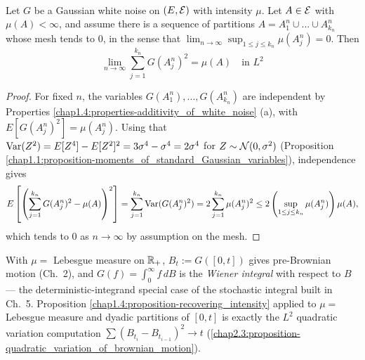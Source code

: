 \begin{proposition} \label{chap1.4:proposition-recovering_intensity}
 \\
Let $G$ be a Gaussian white noise on $(E,\mathcal{E})$ with intensity $\mu$. Let $A \in \mathcal{E}$ with $\mu(A)<\infty$, and assume there is a sequence of partitions $A=A_1^n\cup...\cup A_{k_n}^n$ whose mesh tends to $0$, in the sense that $\lim_{n\to\infty}\sup_{1\leq j \leq k_n}\mu(A_j^n)=0$. Then
$$\lim_{n\to\infty}\sum_{j=1}^{k_n}G(A_j^n)^2=\mu(A) \quad \text{in } L^2$$
\end{proposition}
\begin{proof}
For fixed $n$, the variables $G(A_1^n),...,G(A_{k_n}^n)$ are independent by Properties \ref{chap1.4:properties-additivity_of_white_noise} (a), with $E[G(A_j^n)^2]=\mu(A_j^n)$. Using that $\operatorname{Var}(Z^2)=E[Z^4]-E[Z^2]^2=3\sigma^4-\sigma^4=2\sigma^4$ for $Z\sim\mathcal{N}(0,\sigma^2)$ (Proposition \ref{chap1.1:proposition-moments_of_standard_Gaussian_variables}), independence gives
$$E\left[\left(\sum_{j=1}^{k_n}G(A_j^n)^2-\mu(A)\right)^2\right]=\sum_{j=1}^{k_n}\operatorname{Var}(G(A_j^n)^2)=2\sum_{j=1}^{k_n}\mu(A_j^n)^2 \leq 2\left(\sup_{1\leq j \leq k_n}\mu(A_j^n)\right)\mu(A),$$
which tends to $0$ as $n \to \infty$ by assumption on the mesh.
\end{proof}
\begin{usedin}
With $\mu=$ Lebesgue measure on $\mathbb{R}_+$, $B_t:=G([0,t])$ gives pre-Brownian motion (Ch.\ 2), and $G(f)=\int_0^\infty f\,dB$ is the \textit{Wiener integral} with respect to $B$ --- the deterministic-integrand special case of the stochastic integral built in Ch.\ 5. Proposition \ref{chap1.4:proposition-recovering_intensity} applied to $\mu=$ Lebesgue measure and dyadic partitions of $[0,t]$ is exactly the $L^2$ quadratic variation computation $\sum(B_{t_i}-B_{t_{i-1}})^2\to t$ (\cref{chap2.3:proposition-quadratic_variation_of_brownian_motion}).
\end{usedin}
